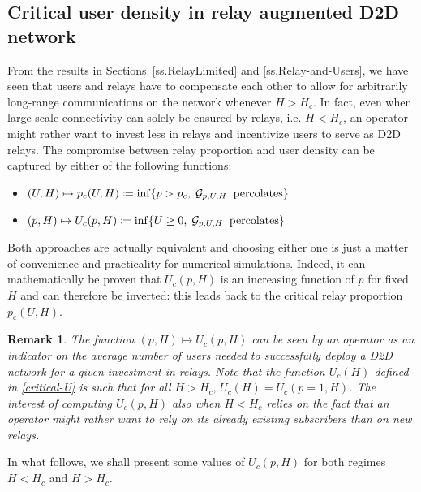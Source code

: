 \documentclass[conference]{IEEEtran}
\newtheorem{remark}{Remark}
\begin{document}
\subsection{Critical user density  in relay augmented D2D network}
\label{ss.NumericalEstimationsU}
From the results in Sections~\ref{ss.RelayLimited} and \ref{ss.Relay-and-Users}, we have seen that users and relays have to compensate each other to allow for arbitrarily long-range communications on the network whenever $H>H_c$. In fact, even when large-scale connectivity can solely be ensured by relays, i.e. $H<H_c$, an operator might rather want to invest less in relays and incentivize users to serve as D2D relays. The compromise between relay proportion and user density can be captured by either of the following functions:
\begin{itemize}
    \item $(U,H) \mapsto p_c(U,H) \coloneqq \inf \lbrace p>p_c, \; \mathcal{G}_{p,U,H}  \text{\: percolates} \rbrace$
    \item $(p,H) \mapsto U_c(p,H) \coloneqq \inf \lbrace U \geq 0, \; \mathcal{G}_{p,U,H}  \text{\: percolates} \rbrace$
\end{itemize}
Both approaches are actually equivalent and choosing either one is just a matter of convenience and practicality for numerical simulations. Indeed, it can mathematically be proven that $U_c(p,H)$ is an increasing function of $p$ for fixed $H$ and can therefore be inverted: this leads back to the critical relay proportion $p_c(U,H)$.

\smallskip
\begin{remark}
\label{remark-inverse-Uc(p,H)}
The function $(p,H) \mapsto U_c(p,H)$ %
can be seen by an operator as an indicator on the average number of users needed to successfully deploy a D2D network for a given investment in relays.
Note that the function $U_c(H)$ defined in \eqref{critical-U} is such that for all $H>H_c, \, U_c(H) = U_c(p=1,H)$. The interest of computing $U_c(p,H)$ also when $H<H_c$ relies on the fact that an operator might rather want to rely on its already existing subscribers than on new relays.
\end{remark}
In what follows, we shall present   some values of $U_c(p,H)$ for both regimes $H<H_c$ and $H>H_c$. 
\end{document}
